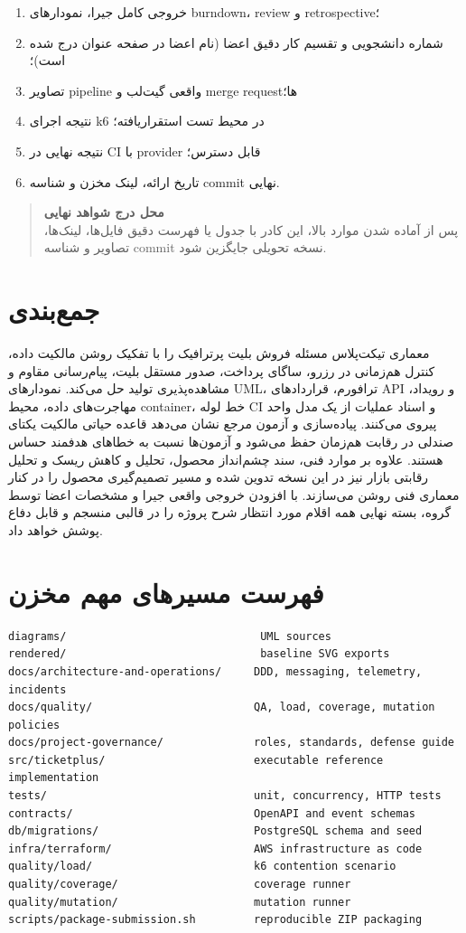 \documentclass[12pt,a4paper]{article}
\newcommand{\en}[1]{\lr{\nolinkurl{#1}}}
\newcommand{\reservedbox}[2]{%
    \begin{quote}
    \textbf{#1}\\[0.3em]
    #2
    \end{quote}
}
\begin{document}
\begin{enumerate}
  \item خروجی کامل جیرا، نمودارهای burndown، review و retrospective؛
  \item شماره دانشجویی و تقسیم کار دقیق اعضا (نام اعضا در صفحه عنوان درج شده است)؛
  \item تصاویر pipeline واقعی گیت‌لب و merge requestها؛
  \item نتیجه اجرای k6 در محیط تست استقرار‌یافته؛
  \item نتیجه نهایی \en{terraform validate} در CI با provider قابل دسترس؛
  \item تاریخ ارائه، لینک مخزن و شناسه commit نهایی.
\end{enumerate}

\reservedbox{محل درج شواهد نهایی}{پس از آماده شدن موارد بالا، این کادر با
جدول یا فهرست دقیق فایل‌ها، لینک‌ها، تصاویر و شناسه commit نسخه تحویلی جایگزین
شود.}

\section{جمع‌بندی}

معماری تیکت‌پلاس مسئله فروش بلیت پرترافیک را با تفکیک روشن مالکیت داده، کنترل
هم‌زمانی در رزرو، ساگای پرداخت، صدور مستقل بلیت، پیام‌رسانی مقاوم و مشاهده‌پذیری
تولید حل می‌کند. نمودارهای UML، ترافورم، قراردادهای API و رویداد، مهاجرت‌های
داده، محیط container، خط لوله CI و اسناد عملیات از یک مدل واحد پیروی می‌کنند.
پیاده‌سازی و آزمون مرجع نشان می‌دهد قاعده حیاتی مالکیت یکتای صندلی در رقابت
هم‌زمان حفظ می‌شود و آزمون‌ها نسبت به خطاهای هدفمند حساس هستند. علاوه بر
موارد فنی، سند چشم‌انداز محصول، تحلیل و کاهش ریسک و تحلیل رقابتی بازار نیز در
این نسخه تدوین شده و مسیر تصمیم‌گیری محصول را در کنار معماری فنی روشن
می‌سازند. با افزودن خروجی واقعی جیرا و مشخصات اعضا توسط گروه، بسته نهایی همه
اقلام مورد انتظار شرح پروژه را در قالبی منسجم و قابل دفاع پوشش خواهد داد.


\section{فهرست مسیرهای مهم مخزن}
\begin{latin}
\begin{lstlisting}
diagrams/                              UML sources
rendered/                              baseline SVG exports
docs/architecture-and-operations/     DDD, messaging, telemetry, incidents
docs/quality/                         QA, load, coverage, mutation policies
docs/project-governance/              roles, standards, defense guide
src/ticketplus/                       executable reference implementation
tests/                                unit, concurrency, HTTP tests
contracts/                            OpenAPI and event schemas
db/migrations/                        PostgreSQL schema and seed
infra/terraform/                      AWS infrastructure as code
quality/load/                         k6 contention scenario
quality/coverage/                     coverage runner
quality/mutation/                     mutation runner
scripts/package-submission.sh         reproducible ZIP packaging
\end{lstlisting}
\end{latin}
\end{document}
